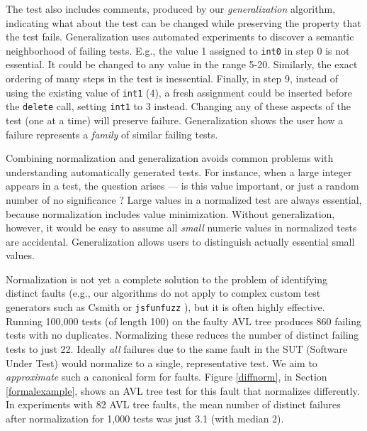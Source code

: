The test also includes comments, produced by our
\emph{generalization} \cite{SmartCheck} algorithm, indicating what
about the test can be changed while preserving the property that
the test fails.  Generalization uses automated experiments to discover
a semantic neighborhood of failing tests.  E.g.,
the value 1 assigned to {\tt int0} in step 0 is not essential.  It
could be changed to any value in the range 5-20.  Similarly, the exact ordering of many steps in the test
is inessential.  Finally, in step 9, instead of using the existing
value of {\tt int1} (4), a fresh assignment could be inserted before
the {\tt delete} call, setting {\tt int1} to 3 instead.  Changing any
of these aspects of the test (one at a time)
will preserve failure.  Generalization shows 
the user how a failure represents  a
\emph{family} of similar failing tests.

Combining normalization and generalization avoids common problems
with understanding automatically generated tests.  For instance,
when a large integer appears in a test, the question
arises --- is this value important, or just a random number of
no significance \cite{MakeMost}?  Large
values in a normalized test are always essential, because normalization includes value minimization.
Without generalization, however, it would be
easy to assume all \emph{small} numeric values in normalized
tests are accidental.  Generalization allows users to
distinguish actually essential small values.

Normalization is not yet a complete solution to the problem of identifying
distinct faults (e.g., our algorithms do not apply to complex custom
test generators such as Csmith \cite{csmith} or {\tt jsfunfuzz}
\cite{jsfunfuzz}), but it is often highly effective.  Running 100,000
tests (of length 100) on the faulty AVL tree produces 860 failing tests with no duplicates.  Normalizing these reduces the number of
distinct failing tests to just 22.  Ideally \emph{all} failures
due to the same fault in the SUT (Software Under Test) would normalize
to a single, representative test.  We aim to
\emph{approximate} such a canonical form for faults.  Figure \ref{diffnorm},
in Section \ref{formalexample}, shows an AVL tree test for this fault that
normalizes differently.  
 In experiments with 82 AVL tree faults,
the mean number of distinct failures after normalization for 1,000
tests was just 3.1 (with median 2). 

